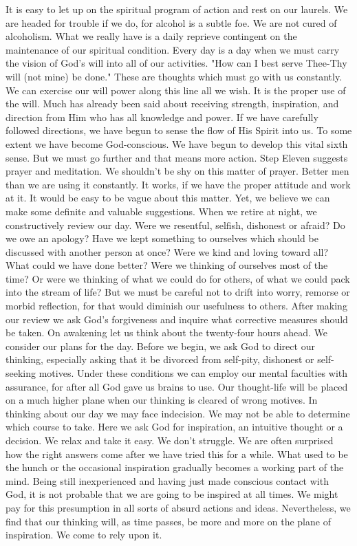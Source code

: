 \begin{biblechapter}
It is easy to let up on the spiritual program of action and rest on our laurels.  We are headed for trouble if we do, for alcohol is a subtle foe.  We are not cured of alcoholism.  What we really have is a daily reprieve contingent on the maintenance of our spiritual condition.  Every day is a day when we must carry the vision of God's will into all of our activities.  "How can I best serve Thee-Thy will (not mine) be done."  These are thoughts which must go with us constantly.  We can exercise our will power along this line all we wish.  It is the proper use of the will.
Much has already been said about receiving strength, inspiration, and direction from Him who has all knowledge and power.  If we have carefully followed directions, we have begun to sense the flow of His Spirit into us.  To some extent we have become God-conscious.  We have begun to develop this vital sixth sense.  But we must go further and that means more action.
Step Eleven suggests prayer and meditation.  We shouldn't be shy on this matter of prayer.  Better men than we are using it constantly.  It works, if we have the proper attitude and work at it.  It would be easy to be vague about this matter.  Yet, we believe we can make some definite and valuable suggestions.
When we retire at night, we constructively review our day.  Were we resentful, selfish, dishonest or afraid?  Do we owe an apology?  Have we kept something to ourselves which should be discussed with another person at once?  Were we kind and loving toward all?  What could we have done better?  Were we thinking of ourselves most of the time?  Or were we thinking of what we could do for others, of what we could pack into the stream of life?  But we must be careful not to drift into worry, remorse or morbid reflection, for that would diminish our usefulness to others.  After making our review we ask God's forgiveness and inquire what corrective measures should be taken.
On awakening let us think about the twenty-four hours ahead.  We consider our plans for the day.  Before we begin, we ask God to direct our thinking, especially asking that it be divorced from self-pity, dishonest or self-seeking motives.  Under these conditions we can employ our mental faculties with assurance, for after all God gave us brains to use.  Our thought-life will be placed on a much higher plane when our thinking is cleared of wrong motives. 
In thinking about our day we may face indecision.  We may not be able to determine which course to take.  Here we ask God for inspiration, an intuitive thought or a decision.  We relax and take it easy.  We don't struggle.  We are often surprised how the right answers come after we have tried this for a while.  What used to be the hunch or the occasional inspiration gradually becomes a working part of the mind.  Being still inexperienced and having just made conscious contact with God, it is not probable that we are going to be inspired at all times.  We might pay for this presumption in all sorts of absurd actions and ideas.  Nevertheless, we find that our thinking will, as time passes, be more and more on the plane of inspiration.  We come to rely upon it.

\end{biblechapter}
